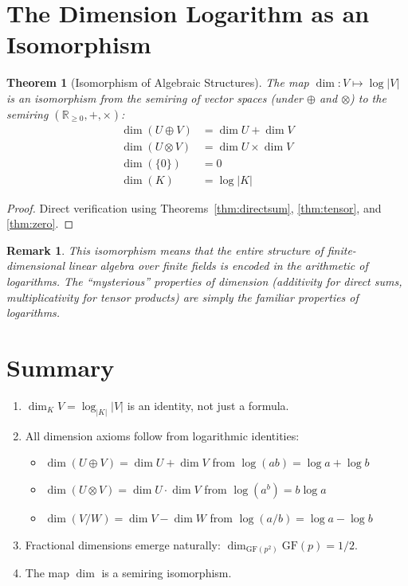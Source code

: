 \documentclass[11pt]{article}
\newtheorem{theorem}[definition]{Theorem}
\newtheorem{remark}[definition]{Remark}
\begin{document}
\section{The Dimension Logarithm as an Isomorphism}
\label{sec:isomorphism}

\begin{theorem}[Isomorphism of Algebraic Structures]
The map $\dim: V \mapsto \log |V|$ is an isomorphism from the semiring of vector spaces (under $\oplus$ and $\otimes$) to the semiring $(\mathbb{R}_{\geq 0}, +, \times)$:
\begin{align*}
\dim(U \oplus V) &= \dim U + \dim V \\
\dim(U \otimes V) &= \dim U \times \dim V \\
\dim(\{0\}) &= 0 \\
\dim(K) &= \log |K|
\end{align*}
\end{theorem}

\begin{proof}
Direct verification using Theorems~\ref{thm:directsum}, \ref{thm:tensor}, and \ref{thm:zero}.
\end{proof}

\begin{remark}
This isomorphism means that the entire structure of finite-dimensional linear algebra over finite fields is \emph{encoded} in the arithmetic of logarithms. The ``mysterious'' properties of dimension (additivity for direct sums, multiplicativity for tensor products) are simply the familiar properties of logarithms.
\end{remark}

\section{Summary}
\label{sec:summary}

\begin{enumerate}
\item $\dim_K V = \log_{|K|} |V|$ is an identity, not just a formula.
\item All dimension axioms follow from logarithmic identities:
  \begin{itemize}
  \item $\dim(U \oplus V) = \dim U + \dim V$ from $\log(ab) = \log a + \log b$
  \item $\dim(U \otimes V) = \dim U \cdot \dim V$ from $\log(a^b) = b \log a$
  \item $\dim(V/W) = \dim V - \dim W$ from $\log(a/b) = \log a - \log b$
  \end{itemize}
\item Fractional dimensions emerge naturally: $\dim_{\text{GF}(p^2)} \text{GF}(p) = 1/2$.
\item The map $\dim$ is a semiring isomorphism.
\end{enumerate}
\end{document}
